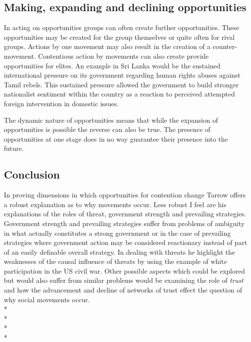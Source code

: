 \documentclass[12pt, a4paper]{article}
\begin{document}
\subsection*{Making, expanding and declining opportunities}
In acting on opportunities groups can often create further opportunities. These opportunities may be created for the group themselves or quite often for rival groups. Actions by one movement may also result in the creation of a counter-movement. 
Contentious action by movements can also create provide opportunities for elites. An example in Sri Lanka would be the sustained international pressure on its government regarding human rights abuses against Tamil rebels. This sustained pressure allowed the government to build stronger nationalist sentiment  within the country as a reaction to perceived attempted foreign intervention in domestic issues.\citep{sri}

The dynamic nature of opportunities means that while the expansion of opportunities is possible the reverse can also be true.  The presence of opportunities at one stage does in no way guarantee their presence into the future. 

\subsection*{Conclusion}
In proving dimensions in which opportunities for contention change Tarrow offers a robust explanation as to why movements occur. Less robust I feel are his explanations of the roles of threat, government strength and prevailing strategies. Government strength and prevailing strategies suffer from problems of ambiguity in what actually constitutes a strong government or in the case of prevailing strategies where government action may be considered reactionary instead of part of an easily definable overall strategy. In dealing with threats he highlight the weaknesses of the causal influence of threats by using the example of white participation in the US civil war. Other possible aspects which could be explored but would also suffer from similar problems would be examining the role of \emph{trust} and how the advancement and decline of networks of trust effect the question of why social movements occur. 
\\*
\\*
\\*
\\*


\end{document}

